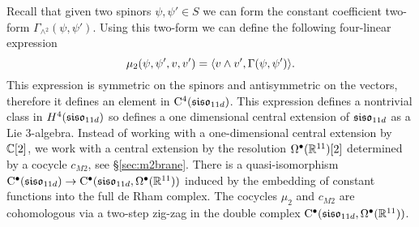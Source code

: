 Recall that given two spinors $\psi, \psi' \in S$ we can form the constant coefficient two-form $\Gamma_{\wedge^2} (\psi, \psi')$. 
Using this two-form we can define the following four-linear expression
\[
\mu_2 (\psi, \psi',v,v') = \langle v \wedge v', \Gamma(\psi, \psi')\rangle .
\]
This expression is symmetric on the spinors and antisymmetric on the vectors, therefore it defines an element in ${\rm C}^4(\mathfrak{siso}_{11d})$. 
This expression defines a nontrivial class in $H^4(\mathfrak{siso}_{11d})$ so defines a one dimensional central extension of $\mathfrak{siso}_{11d}$ as a Lie 3-algebra. 
Instead of working with a one-dimensional central extension by $\mathbb C[2]$, we work with a central extension by the resolution $\Omega^\bullet(\mathbb R^{11})[2]$ determined by a cocycle $c_{M2}$, see \S \ref{sec:m2brane}. 
There is a quasi-isomorphism ${\rm C}^\bullet(\mathfrak{siso}_{11d})\to {\rm C}^\bullet(\mathfrak{siso}_{11d}, \Omega^\bullet (\mathbb{R}^{11}))$ induced by the embedding of constant functions into the full de Rham complex.
The cocycles $\mu_2$ and $c_{M2}$ are cohomologous via a two-step zig-zag in the double complex ${\rm C}^\bullet(\mathfrak{siso}_{11d}, \Omega^\bullet (\mathbb{R}^{11}))$. 